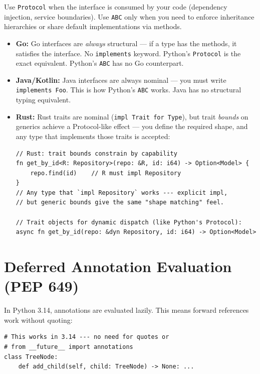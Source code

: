 \documentclass[11pt,a4paper,oneside]{book}
\newcommand{\py}[1]{\texttt{\color{pyblue}#1}}
\newcommand{\rustcode}[1]{\texttt{\color{BrickRed}#1}}
\newcommand{\javacode}[1]{\texttt{\color{javaorange!80!black}#1}}
\begin{document}
\begin{successbox}[title={Prefer Protocol}]
Use \py{Protocol} when the interface is consumed by your code (dependency injection,
service boundaries). Use \py{ABC} only when you need to enforce inheritance hierarchies
or share default implementations via methods.
\end{successbox}

\begin{analogybox}
\begin{itemize}
    \item \textcolor{goblue}{\textbf{Go:}} Go interfaces are \emph{always} structural ---
          if a type has the methods, it satisfies the interface. No \texttt{implements} keyword.
          Python's \py{Protocol} is the exact equivalent. Python's \py{ABC} has no Go counterpart.
    \item \textcolor{javaorange}{\textbf{Java/Kotlin:}} Java interfaces are always nominal ---
          you must write \javacode{implements Foo}. This is how Python's \py{ABC} works.
          Java has no structural typing equivalent.
    \item \textcolor{BrickRed}{\textbf{Rust:}} Rust traits are nominal (\rustcode{impl Trait for Type}),
          but trait \emph{bounds} on generics achieve a Protocol-like effect --- you define the
          required shape, and any type that implements those traits is accepted:
\begin{lstlisting}[style=rust,numbers=none]
// Rust: trait bounds constrain by capability
fn get_by_id<R: Repository>(repo: &R, id: i64) -> Option<Model> {
    repo.find(id)    // R must impl Repository
}
// Any type that `impl Repository` works --- explicit impl,
// but generic bounds give the same "shape matching" feel.

// Trait objects for dynamic dispatch (like Python's Protocol):
async fn get_by_id(repo: &dyn Repository, id: i64) -> Option<Model>
\end{lstlisting}
\end{itemize}
\end{analogybox}

\section{Deferred Annotation Evaluation (PEP 649)}

In Python 3.14, annotations are evaluated lazily. This means forward references work without
quoting:

\begin{lstlisting}[style=python]
# This works in 3.14 --- no need for quotes or
# from __future__ import annotations
class TreeNode:
    def add_child(self, child: TreeNode) -> None: ...
\end{lstlisting}
\end{document}
